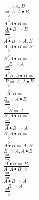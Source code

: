 \documentclass[11pt]{article}
\begin{document}
\begin{center}
\bigskip
\\$\frac{\Rightarrow A, B}{\Rightarrow A, A\bullet B}$
\bigskip
\\$\frac{\Rightarrow }{\Rightarrow }$
\bigskip
\\$\frac{A, A\bullet B\Rightarrow }{A\bullet B\Rightarrow B}$
\bigskip
\\$\frac{\Rightarrow }{\Rightarrow }$
\bigskip
\\$\frac{A\bullet B\Rightarrow A, B}{A, A\bullet B\Rightarrow B}$
\bigskip
\\$\frac{\Rightarrow }{\Rightarrow }$
\bigskip
\\$\frac{B, A\bullet B\Rightarrow }{B\Rightarrow A}$
\bigskip
\\$\frac{\Rightarrow }{\Rightarrow }$
\bigskip
\\$\frac{A, B, A\bullet B\Rightarrow }{B\Rightarrow A, A\bullet B}$
\bigskip
\\$\frac{\Rightarrow }{\Rightarrow }$
\bigskip
\\$\frac{A, B\Rightarrow }{B\Rightarrow A\bullet B}$
\bigskip
\\$\frac{\Rightarrow }{\Rightarrow }$
\bigskip
\\$\frac{B\Rightarrow A}{B, A\bullet B\Rightarrow }$
\bigskip
\\$\frac{\Rightarrow }{\Rightarrow }$
\bigskip
\\$\frac{A\bullet B\Rightarrow A}{B, A\bullet B\Rightarrow }$
\bigskip
\\$\frac{\Rightarrow }{\Rightarrow }$
\bigskip
\\$\frac{A\bullet B\Rightarrow A, B}{B\Rightarrow A, A\bullet B}$
\bigskip
\\$\frac{\Rightarrow }{\Rightarrow }$
\bigskip
\\$\frac{A\bullet B\Rightarrow B}{A, A\bullet B\Rightarrow }$
\bigskip
\\$\frac{\Rightarrow }{\Rightarrow }$
\bigskip
\\$\frac{A\bullet B\Rightarrow A}{B\Rightarrow A}$
\bigskip
\\$\frac{\Rightarrow }{\Rightarrow }$
\bigskip
\\
\end{center}
\end{document}

